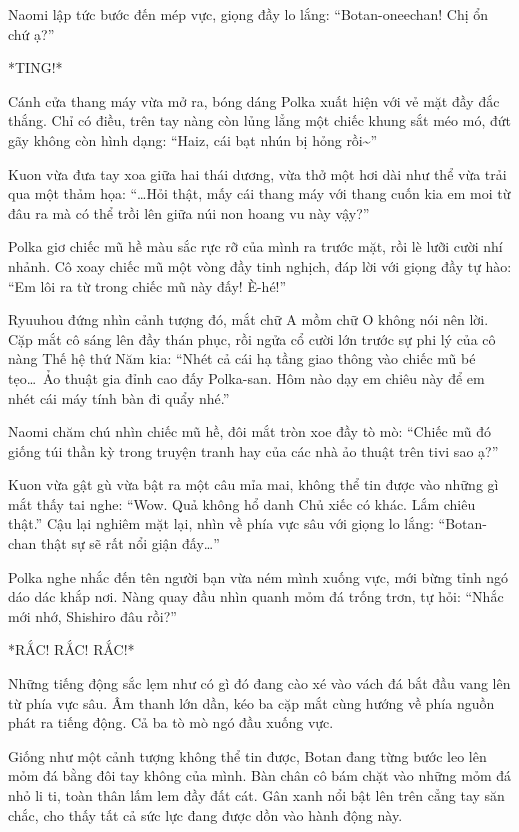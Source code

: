 \documentclass[../main.tex]{subfiles}
\begin{document}
Naomi lập tức bước đến mép vực, giọng đầy lo lắng: ``Botan-oneechan! Chị ổn chứ ạ?''

*TING!*

Cánh cửa thang máy vừa mở ra, bóng dáng Polka xuất hiện với vẻ mặt đầy đắc thắng. Chỉ có điều, trên tay nàng còn lủng lẳng một chiếc khung sắt méo mó, đứt gãy không còn hình dạng: ``Haiz, cái bạt nhún bị hỏng rồi\~{}''

Kuon vừa đưa tay xoa giữa hai thái dương, vừa thở một hơi dài như thể vừa trải qua một thảm họa: ``\dots Hỏi thật, mấy cái thang máy với thang cuốn kia em moi từ đâu ra mà có thể trồi lên giữa núi non hoang vu này vậy?''

Polka giơ chiếc mũ hề màu sắc rực rỡ của mình ra trước mặt, rồi lè lưỡi cười nhí nhảnh. Cô xoay chiếc mũ một vòng đầy tinh nghịch, đáp lời với giọng đầy tự hào: ``Em lôi ra từ trong chiếc mũ này đấy! È-hé!''

Ryuuhou đứng nhìn cảnh tượng đó, mắt chữ A mồm chữ O không nói nên lời. Cặp mắt cô sáng lên đầy thán phục, rồi ngửa cổ cười lớn trước sự phi lý của cô nàng Thế hệ thứ Năm kia: ``Nhét cả cái hạ tầng giao thông vào chiếc mũ bé tẹo\dots\ Ảo thuật gia đỉnh cao đấy Polka-san. Hôm nào dạy em chiêu này để em nhét cái máy tính bàn đi quẩy nhé.''

Naomi chăm chú nhìn chiếc mũ hề, đôi mắt tròn xoe đầy tò mò: ``Chiếc mũ đó giống túi thần kỳ trong truyện tranh hay của các nhà ảo thuật trên tivi sao ạ?''

Kuon vừa gật gù vừa bật ra một câu mỉa mai, không thể tin được vào những gì mắt thấy tai nghe: ``Wow. Quả không hổ danh Chủ xiếc có khác. Lắm chiêu thật.'' Cậu lại nghiêm mặt lại, nhìn về phía vực sâu với giọng lo lắng: ``Botan-chan thật sự sẽ rất nổi giận đấy\dots''

Polka nghe nhắc đến tên người bạn vừa ném mình xuống vực, mới bừng tỉnh ngó dáo dác khắp nơi. Nàng quay đầu nhìn quanh mỏm đá trống trơn, tự hỏi: ``Nhắc mới nhớ, Shishiro đâu rồi?''

*RẮC! RẮC! RẮC!*

Những tiếng động sắc lẹm như có gì đó đang cào xé vào vách đá bắt đầu vang lên từ phía vực sâu. Âm thanh lớn dần, kéo ba cặp mắt cùng hướng về phía nguồn phát ra tiếng động. Cả ba tò mò ngó đầu xuống vực.

Giống như một cảnh tượng không thể tin được, Botan đang từng bước leo lên mỏm đá bằng đôi tay không của mình. Bàn chân cô bám chặt vào những mỏm đá nhỏ li ti, toàn thân lấm lem đầy đất cát. Gân xanh nổi bật lên trên cẳng tay săn chắc, cho thấy tất cả sức lực đang được dồn vào hành động này.
\end{document}
